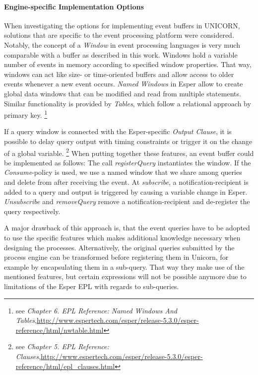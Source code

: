 \paragraph{Engine-specific Implementation Options}
When investigating the options for implementing event buffers in UNICORN, solutions that are specific to the event processing platform were considered.
Notably, the concept of a \textit{Window} in event processing languages is very much comparable with a buffer as described in this work. Windows hold a variable number of events in memory according to specified window properties. That way, windows can act like size- or time-oriented buffers and allow access to older events whenever a new event occurs.
\textit{Named Windows} in Esper allow to create global data windows that can be modified and read from multiple statements. Similar functionality is provided by \textit{Tables}, which follow a relational approach by primary key.
\footnote{see \textit{Chapter 6. EPL Reference: Named Windows And Tables},\newline \url{http://www.espertech.com/esper/release-5.3.0/esper-reference/html/nwtable.html}}

If a query window is connected with the Esper-specific \textit{Output Clause}, it is possible to delay query output with timing constraints or trigger it on the change of a global variable.
\footnote{see \textit{Chapter 5. EPL Reference: Clauses},\newline \url{http://www.espertech.com/esper/release-5.3.0/esper-reference/html/epl\_clauses.html}}
When putting together these features, an event buffer could be implemented as follows: The call \textit{registerQuery} instantiates the window. If the \textit{Consume}-policy is used, we use a named window that we share among queries and delete from after receiving the event. 
At \textit{subscribe}, a notification-recipient is added to a query and output is triggered by causing a variable change in Esper. \textit{Unsubscribe} and \textit{removeQuery} remove a notification-recipient and de-register the query respectively.

A major drawback of this approach is, that the event queries have to be adopted to use the specific features which makes additional knowledge necessary when designing the processes.
Alternatively, the original queries submitted by the process engine can be transformed before registering them in Unicorn, for example by encapsulating them in a sub-query. That way they make use of the mentioned features, but certain expressions will not be possible anymore due to limitations of the Esper EPL with regards to sub-queries.

